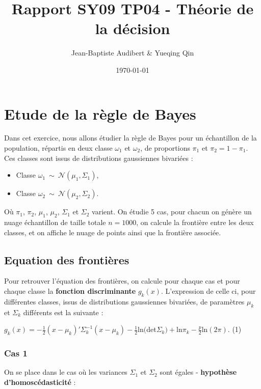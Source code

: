 \documentclass[a4paper,11pt]{article}
\title{Rapport SY09 TP04 - Théorie de la décision}
\author{Jean-Baptiste Audibert \& Yueqing Qin}
\date{\today}
\begin{document}
\maketitle

\section{Etude de la règle de Bayes} 

\noindent Dans cet exercice, nous allons étudier la règle de Bayes pour un échantillon de la population, répartis en deux classe $\omega_1$ et $\omega_2$, de proportions $\pi_1$ et $\pi_2 = 1 - \pi_1$. Ces classes sont issus de distributions gaussiennes bivariées :  \\

\begin{itemize}
\item Classe $\omega_1 \  \sim \ \mathcal{N}( \mu_1, \Sigma_1)$,
\item Classe $\omega_2 \  \sim  \ \mathcal{N}( \mu_2, \Sigma_2)$. \\
\end{itemize}

\noindent Où $\pi_1$, $\pi_2$, $\mu_1$, $\mu_2$, $\Sigma_1$ et $\Sigma_2$ varient.
\noindent On étudie 5 cas, pour chacun on génère un nuage échantillon de taille totale $n = 1000$, on calcule la frontière entre les deux classes, et on affiche le nuage de points ainsi que la frontière associée.

\subsection{Equation des frontières}

\noindent Pour retrouver l'équation des frontières, on calcule pour chaque cas et pour chaque classe la \textbf{fonction discriminante} $g_k(x)$. L'expression de celle ci, pour différentes classes, issus de distributions gaussiennes bivariées, de paramètres $\mu_k$ et $\Sigma_k$ différents est la suivante : 

\begin{center}
$g_k(x) = -\frac{1}{2}(x-\mu_k)' \Sigma_k^{-1}(x-\mu_k) - \frac{1}{2}$ln$($det$\Sigma_k) + $ln$\pi_k - \frac{p}{2}$ln$(2\pi).$ (1)
\end{center}

\subsubsection{Cas 1}
\noindent On se place dans le cas où les variances $\Sigma_1$ et $\Sigma_2$ sont égales - \textbf{hypothèse d'homoscédasticité} : 
\end{document}

